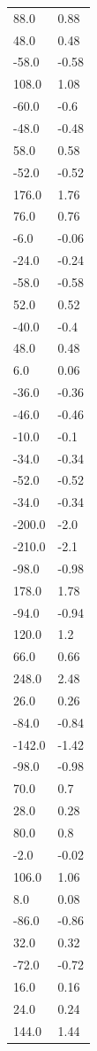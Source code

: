 \begin{longtable}{ll}
88.0 & 0.88 \\
48.0 & 0.48 \\
-58.0 & -0.58 \\
108.0 & 1.08 \\
-60.0 & -0.6 \\
-48.0 & -0.48 \\
58.0 & 0.58 \\
-52.0 & -0.52 \\
176.0 & 1.76 \\
76.0 & 0.76 \\
-6.0 & -0.06 \\
-24.0 & -0.24 \\
-58.0 & -0.58 \\
52.0 & 0.52 \\
-40.0 & -0.4 \\
48.0 & 0.48 \\
6.0 & 0.06 \\
-36.0 & -0.36 \\
-46.0 & -0.46 \\
-10.0 & -0.1 \\
-34.0 & -0.34 \\
-52.0 & -0.52 \\
-34.0 & -0.34 \\
-200.0 & -2.0 \\
-210.0 & -2.1 \\
-98.0 & -0.98 \\
178.0 & 1.78 \\
-94.0 & -0.94 \\
120.0 & 1.2 \\
66.0 & 0.66 \\
248.0 & 2.48 \\
26.0 & 0.26 \\
-84.0 & -0.84 \\
-142.0 & -1.42 \\
-98.0 & -0.98 \\
70.0 & 0.7 \\
28.0 & 0.28 \\
80.0 & 0.8 \\
-2.0 & -0.02 \\
106.0 & 1.06 \\
8.0 & 0.08 \\
-86.0 & -0.86 \\
32.0 & 0.32 \\
-72.0 & -0.72 \\
16.0 & 0.16 \\
24.0 & 0.24 \\
144.0 & 1.44 \\

\end{longtable}
